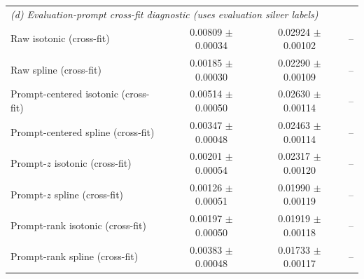 \begin{tabular}{lccc}
\midrule
\multicolumn{4}{l}{\textit{(d) Evaluation-prompt cross-fit diagnostic (uses evaluation silver labels)}} \\
Raw isotonic (cross-fit) & 0.00809 $\pm$ 0.00034 & 0.02924 $\pm$ 0.00102 & -- \\
Raw spline (cross-fit) & 0.00185 $\pm$ 0.00030 & 0.02290 $\pm$ 0.00109 & -- \\
Prompt-centered isotonic (cross-fit) & 0.00514 $\pm$ 0.00050 & 0.02630 $\pm$ 0.00114 & -- \\
Prompt-centered spline (cross-fit) & 0.00347 $\pm$ 0.00048 & 0.02463 $\pm$ 0.00114 & -- \\
Prompt-$z$ isotonic (cross-fit) & 0.00201 $\pm$ 0.00054 & 0.02317 $\pm$ 0.00120 & -- \\
Prompt-$z$ spline (cross-fit) & 0.00126 $\pm$ 0.00051 & 0.01990 $\pm$ 0.00119 & -- \\
Prompt-rank isotonic (cross-fit) & 0.00197 $\pm$ 0.00050 & 0.01919 $\pm$ 0.00118 & -- \\
Prompt-rank spline (cross-fit) & 0.00383 $\pm$ 0.00048 & 0.01733 $\pm$ 0.00117 & -- \\
\bottomrule
\end{tabular}
